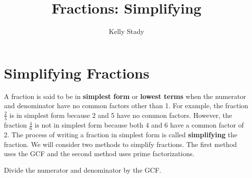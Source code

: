 \documentclass{ximera}[font=12pt]  %
\title{Fractions: Simplifying}   %
\author{Kelly Stady}
\begin{document}
\begin{abstract}

\end{abstract}

\maketitle

\label{xim:FracsSimplify}


\section*{Simplifying Fractions}

A fraction is said to be in \textbf{simplest form} or \textbf{lowest terms} when the
numerator and denominator have no common factors other than 1.  For example, the fraction
$\textstyle \frac{2}{5}$ is in simplest form because 2 and 5 have no common factors.  However, the fraction
$\textstyle \frac{4}{6}$ is not in simplest form because both 4 and 6 have a common factor of 2.  The
process of writing a fraction in simplest form is called \textbf{simplifying} the fraction.  We will consider two methods 
to simplify fractions.  The first method uses the GCF and the second method uses prime factorizations.

\begin{procedure}

    Divide the numerator and denominator by the GCF.

\end{procedure}
\end{document}
